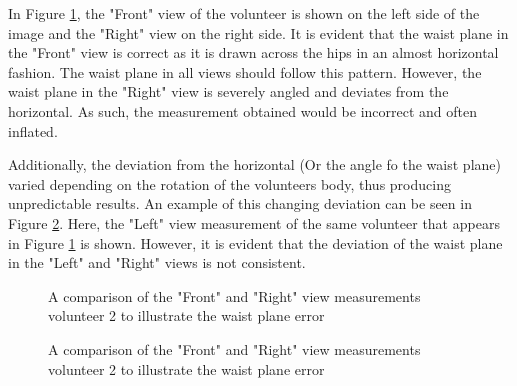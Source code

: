 In Figure \ref{fig:waistPlaneError}, the "Front" view of the volunteer is shown on the left side of the image and the "Right" view on the right side. It is evident that the waist plane in the "Front" view is correct as it is drawn across the hips in an almost horizontal fashion. The waist plane in all views should follow this pattern. However, the waist plane in the "Right" view is severely angled and deviates from the horizontal. As such, the measurement obtained would be incorrect and often inflated. 

Additionally, the deviation from the horizontal (Or the angle fo the waist plane) varied depending on the rotation of the volunteers body, thus producing unpredictable results. An example of this changing deviation can be seen in Figure \ref{fig:volunteer2Left}. Here, the "Left" view measurement of the same volunteer that appears in Figure \ref{fig:waistPlaneError} is shown. However, it is evident that the deviation of the waist plane in the "Left" and "Right" views is not consistent. 

\begin{figure}[ht]
	\centering
	{%
		\setlength{\fboxsep}{0pt}%
		\setlength{\fboxrule}{0.5pt}%
		}
	\caption{A comparison of the "Front" and "Right" view measurements volunteer 2 to illustrate the waist plane error}
	\label{fig:waistPlaneError}
\end{figure}

\begin{figure}[ht]
	\centering
	{%
		\setlength{\fboxsep}{0pt}%
		\setlength{\fboxrule}{0.5pt}%
		}
	\caption{A comparison of the "Front" and "Right" view measurements volunteer 2 to illustrate the waist plane error}
	\label{fig:volunteer2Left}
\end{figure}


